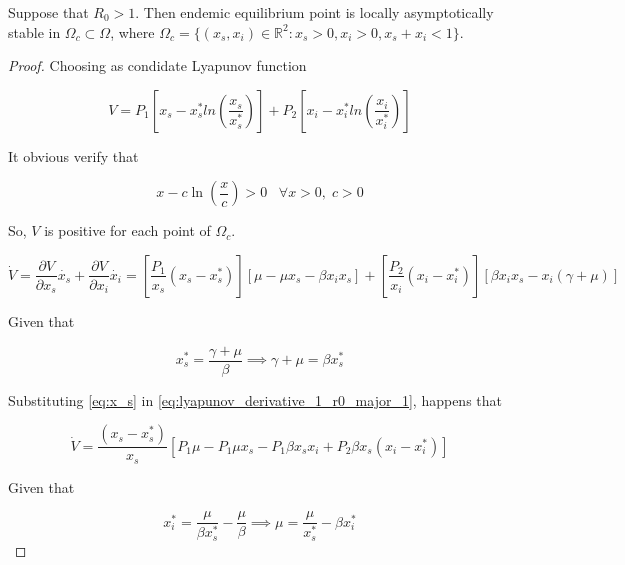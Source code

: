 \begin{theorem}
Suppose that $R_0 > 1$. Then endemic equilibrium point is locally asymptotically stable in $\Omega_c \subset \Omega$, where $\Omega_c = \{\left(x_s,x_i\right) \in \mathbb{R}^2 : x_s > 0, x_i > 0, x_s + x_i < 1\}$.
\end{theorem}

\begin{proof}
Choosing as condidate Lyapunov function

\begin{equation}
    \label{eq:lyapunov_r0_major_1}
    V = P_1 \left[ x_s - x_s^*ln\left( \frac{x_s}{x_s^*} \right)\right] + P_2 \left[ x_i - x_i^*ln\left( \frac{x_i}{x_i^*} \right)\right]
\end{equation}

It obvious verify that

\begin{equation}
    x - c\ln\left(\frac{x}{c}\right) > 0 \;\;\; \forall x > 0, \; c > 0
\end{equation}

So, $V$ is positive for each point of $\Omega_c$.

\begin{equation}
    \label{eq:lyapunov_derivative_1_r0_major_1}
    \dot{V} = \frac{\partial V}{\partial x_s} \dot{x_s} + \frac{\partial V}{\partial x_i} \dot{x_i} = \left[ \frac{P_1}{x_s}(x_s - x_s^*) \right] \left[ \mu - \mu x_s - \beta x_i x_s \right] + \left[ \frac{P_2}{x_i}(x_i - x_i^*) \right] \left[ \beta x_i x_s - x_i (\gamma + \mu) \right]
\end{equation}

Given that

\begin{equation}
    \label{eq:x_s}
    x_s^* = \frac{\gamma + \mu}{\beta} \implies \gamma + \mu = \beta x_s^*
\end{equation}

Substituting \ref{eq:x_s} in \ref{eq:lyapunov_derivative_1_r0_major_1}, happens that

\begin{equation}
    \label{eq:lyapunov_derivative_2_r0_major_1}
    \dot{V} =  \frac{\left(x_s - x_s^*\right)}{x_s} \left[  P_1 \mu - P_1 \mu x_s - P_1\beta x_sx_i+P_2 \beta x_s \left( x_i - x_i^* \right) \right]
\end{equation}

Given that

\begin{equation}
    \label{eq:x_i}
    x_i^* = \frac{\mu}{\beta x_s^*} - \frac{\mu}{\beta} \implies \mu = \frac{\mu}{x_s^*} - \beta x_i^*
\end{equation}


\end{proof}
